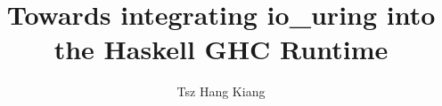\documentclass[12pt]{gatechthesis}
\title{Towards integrating io\_uring into the Haskell GHC Runtime}
\author{Tsz Hang Kiang}
\begin{document}


\begin{frontmatter}
    \makeTOC
    \makeListOfFigures
    
\end{frontmatter} 

\begin{thesisbody}
    
    
	
	
	
	
	
	
	
    \makeBibliography
\end{thesisbody}
\end{document}
